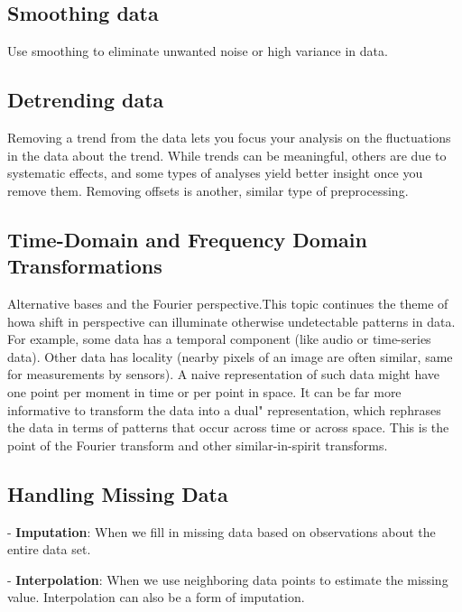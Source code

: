 \documentclass[openany]{book}
\begin{document}
\subsection{Smoothing data}

Use smoothing to eliminate unwanted noise or high variance in data.

\subsection{Detrending data}

Removing a trend from the data lets you focus your analysis on the fluctuations in the data about the trend. While trends can be meaningful, others are due to systematic effects, and some types of analyses yield better insight once you remove them. Removing offsets is another, similar type of preprocessing.

\subsection{Time-Domain and Frequency Domain Transformations}

Alternative bases and the Fourier perspective.This topic continues the theme of howa  shift  in  perspective  can  illuminate  otherwise  undetectable  patterns  in  data.   For example, some data has a temporal component (like audio or time-series data).  Other data has locality (nearby pixels of an image are often similar, same for measurements by sensors).  A naive representation of such data might have one point per moment in time or per point in space.  It can be far more informative to transform the data into a dual" representation, which rephrases the data in terms of patterns that occur across  time  or  across  space.   This  is  the  point  of  the  Fourier  transform  and  other similar-in-spirit transforms.










\subsection{Handling Missing Data}

- \textbf{Imputation}: When we fill in missing data based on observations about the entire data set.

- \textbf{Interpolation}: When we use neighboring data points to estimate the missing value. Interpolation can also be a form of imputation.
\end{document}
